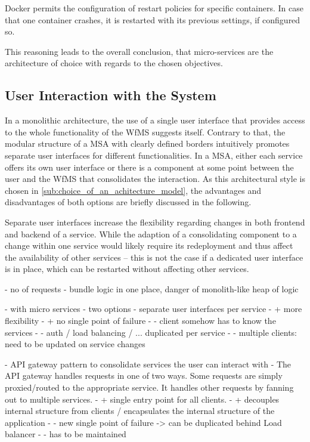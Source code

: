  Docker permits the configuration of restart policies for specific containers. In case that one container crashes, it is restarted with its previous settings, if configured so.

  This reasoning leads to the overall conclusion, that micro-services are the architecture of choice with regards to the chosen objectives.

\subsection{User Interaction with the System} %
\label{sub:user_interaction_with_the_system}
  In a monolithic architecture, the use of a single user interface that provides access to the whole functionality of the \ac{WfMS} suggests itself.
  Contrary to that, the modular structure of a \ac{MSA} with clearly defined borders intuitively promotes separate user interfaces for different functionalities.
  In a \ac{MSA}, either each service offers its own user interface or there is a component at some point between the user and the \ac{WfMS} that consolidates the interaction. As this architectural style is chosen in \ref{sub:choice_of_an_achitecture_model}, the advantages and disadvantages of both options are briefly discussed in the following.

  Separate user interfaces increase the flexibility regarding changes in both frontend and backend of a service. While the adaption of a consolidating component to a change within one service would likely require its redeployment and thus affect the availability of other services -- this is not the case if a dedicated user interface is in place, which can be restarted without affecting other services.



  - no of requests
  - bundle logic in one place, danger of monolith-like heap of logic

  - with micro services
    - two options
      - separate user interfaces per service
        - + more flexibility
        - + no single point of failure
        - - client somehow has to know the services
        - - auth / load balancing / ... duplicated per service
        - - multiple clients: need to be updated on service changes

      - API gateway pattern to consolidate  services the user can interact with
        - The API gateway handles requests in one of two ways. Some requests are simply proxied/routed to the appropriate service. It handles other requests by fanning out to multiple services.
        - + single entry point for all clients.
        - + decouples internal structure from clients / encapsulates the internal structure of the application
        - - new single point of failure
          -> can be duplicated behind Load balancer
        - - has to be maintained

